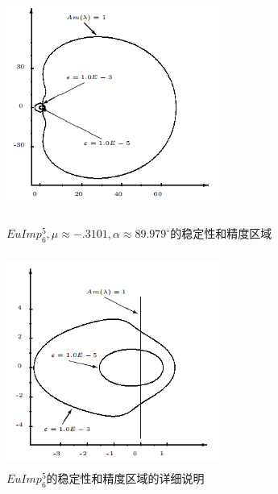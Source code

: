 \documentclass[12pt,a4paper]{article}
\begin{document}
\begin{figure}[htbp]
	{
		\begin{minipage}{6cm}
			\centering
			\includegraphics[width=7cm,height=7cm]{./figures/7.png}
			\caption{$EuImp_{6}^{5},\mu \approx -.3101, \alpha \approx 89.979^{\circ}$的稳定性和精度区域}
			\label{5.7}
		\end{minipage}
	}
	{
		\begin{minipage}{6cm}
			\centering
			\includegraphics[width=7cm,height=7cm]{./figures/8.png}
			\caption{$EuImp_{6}^{5}$的稳定性和精度区域的详细说明}
			\label{5.8}
		\end{minipage}
	}
\end{figure}
\end{document}
